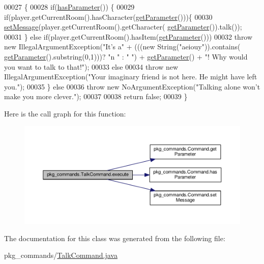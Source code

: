 \begin{DoxyCode}
00027                                                                                               \{
00028         \textcolor{keywordflow}{if}(\hyperlink{classpkg__commands_1_1Command_a02af95ab3f1898a66259ab7c177b6998}{hasParameter}()) \{
00029             \textcolor{keywordflow}{if}(player.getCurrentRoom().hasCharacter(\hyperlink{classpkg__commands_1_1Command_a41c92d445be73ea9d62320c65efb8434}{getParameter}()))\{
00030                 \hyperlink{classpkg__commands_1_1Command_ae210ff216fe908b111ba1c988a963d13}{setMessage}(player.getCurrentRoom().getCharacter(
      \hyperlink{classpkg__commands_1_1Command_a41c92d445be73ea9d62320c65efb8434}{getParameter}()).talk());
00031             \} \textcolor{keywordflow}{else} \textcolor{keywordflow}{if}(player.getCurrentRoom().hasItem(\hyperlink{classpkg__commands_1_1Command_a41c92d445be73ea9d62320c65efb8434}{getParameter}()))
00032                 \textcolor{keywordflow}{throw} \textcolor{keyword}{new} IllegalArgumentException(\textcolor{stringliteral}{"It's a"} + (((\textcolor{keyword}{new} String(\textcolor{stringliteral}{"aeiouy"})).contains(
      \hyperlink{classpkg__commands_1_1Command_a41c92d445be73ea9d62320c65efb8434}{getParameter}().substring(0,1)))? \textcolor{stringliteral}{"n "} : \textcolor{stringliteral}{" "}) + \hyperlink{classpkg__commands_1_1Command_a41c92d445be73ea9d62320c65efb8434}{getParameter}() + \textcolor{stringliteral}{"! Why would you
       want to talk to that!"});
00033             \textcolor{keywordflow}{else}
00034                 \textcolor{keywordflow}{throw} \textcolor{keyword}{new} IllegalArgumentException(\textcolor{stringliteral}{"Your imaginary friend is not here. He might have left
       you."});
00035         \} \textcolor{keywordflow}{else}
00036             \textcolor{keywordflow}{throw} \textcolor{keyword}{new} NoArgumentException(\textcolor{stringliteral}{"Talking alone won't make you more clever."});
00037 
00038         \textcolor{keywordflow}{return} \textcolor{keyword}{false};
00039     \}
\end{DoxyCode}


Here is the call graph for this function\-:
\nopagebreak
\begin{figure}[H]
\begin{center}
\leavevmode
\includegraphics[width=350pt]{classpkg__commands_1_1TalkCommand_a413573388e24a2d442f9814695f7e47c_cgraph}
\end{center}
\end{figure}




The documentation for this class was generated from the following file\-:\begin{DoxyCompactItemize}
\item 
pkg\-\_\-commands/\hyperlink{TalkCommand_8java}{Talk\-Command.\-java}\end{DoxyCompactItemize}

